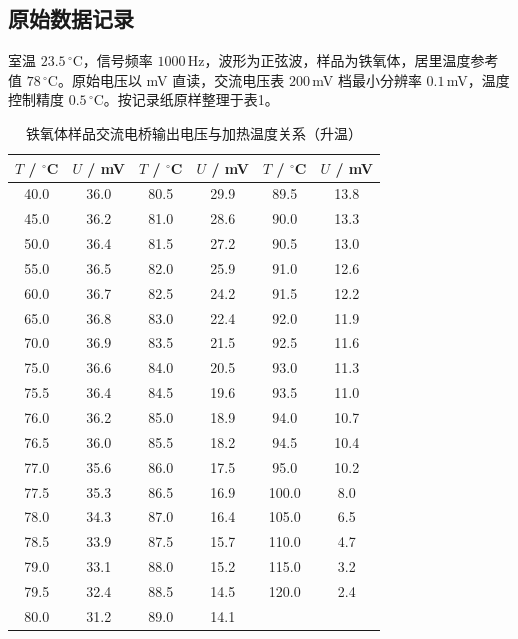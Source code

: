 \documentclass{Phyport}
\begin{document}
\subsection{原始数据记录}

室温 $23.5\,^\circ$C，信号频率 $1000$\,Hz，波形为正弦波，样品为铁氧体，居里温度参考值 $78\,^\circ$C。原始电压以 mV 直读，交流电压表 $200$\,mV 档最小分辨率 $0.1$\,mV，温度控制精度 $0.5\,^\circ$C。按记录纸原样整理于表1。

\begin{table}[H]
    \centering
    \caption{铁氧体样品交流电桥输出电压与加热温度关系（升温）}
    \label{tab:data}
    \small
    \begin{tabular}{cccccc}
        \toprule
        $T$ / $^\circ$C & $U$ / mV & $T$ / $^\circ$C & $U$ / mV & $T$ / $^\circ$C & $U$ / mV \\
        \midrule
        40.0 & 36.0 &  80.5 & 29.9 &  89.5 & 13.8 \\
        45.0 & 36.2 &  81.0 & 28.6 &  90.0 & 13.3 \\
        50.0 & 36.4 &  81.5 & 27.2 &  90.5 & 13.0 \\
        55.0 & 36.5 &  82.0 & 25.9 &  91.0 & 12.6 \\
        60.0 & 36.7 &  82.5 & 24.2 &  91.5 & 12.2 \\
        65.0 & 36.8 &  83.0 & 22.4 &  92.0 & 11.9 \\
        70.0 & 36.9 &  83.5 & 21.5 &  92.5 & 11.6 \\
        75.0 & 36.6 &  84.0 & 20.5 &  93.0 & 11.3 \\
        75.5 & 36.4 &  84.5 & 19.6 &  93.5 & 11.0 \\
        76.0 & 36.2 &  85.0 & 18.9 &  94.0 & 10.7 \\
        76.5 & 36.0 &  85.5 & 18.2 &  94.5 & 10.4 \\
        77.0 & 35.6 &  86.0 & 17.5 &  95.0 & 10.2 \\
        77.5 & 35.3 &  86.5 & 16.9 & 100.0 &  8.0 \\
        78.0 & 34.3 &  87.0 & 16.4 & 105.0 &  6.5 \\
        78.5 & 33.9 &  87.5 & 15.7 & 110.0 &  4.7 \\
        79.0 & 33.1 &  88.0 & 15.2 & 115.0 &  3.2 \\
        79.5 & 32.4 &  88.5 & 14.5 & 120.0 &  2.4 \\
        80.0 & 31.2 &  89.0 & 14.1 &       &      \\
        \bottomrule
    \end{tabular}
\end{table}
\end{document}
